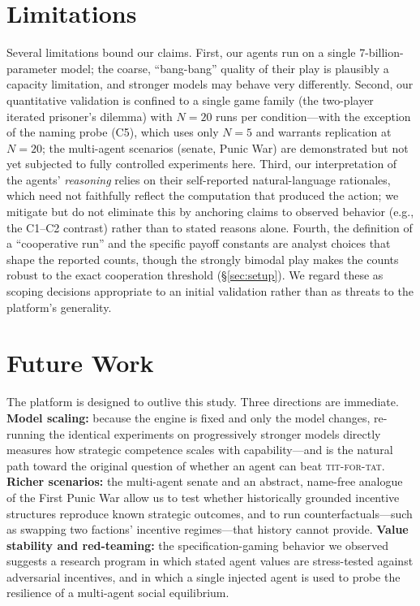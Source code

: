 \section{Limitations}
\label{sec:limitations}

Several limitations bound our claims. First, our agents run on a single 7-billion-parameter model; the coarse, ``bang-bang'' quality of their play is plausibly a capacity limitation, and stronger models may behave very differently. Second, our quantitative validation is confined to a single game family (the two-player iterated prisoner's dilemma) with $N=20$ runs per condition---with the exception of the naming probe (C5), which uses only $N=5$ and warrants replication at $N=20$; the multi-agent scenarios (senate, Punic War) are demonstrated but not yet subjected to fully controlled experiments here. Third, our interpretation of the agents' \emph{reasoning} relies on their self-reported natural-language rationales, which need not faithfully reflect the computation that produced the action; we mitigate but do not eliminate this by anchoring claims to observed behavior (e.g., the C1--C2 contrast) rather than to stated reasons alone. Fourth, the definition of a ``cooperative run'' and the specific payoff constants are analyst choices that shape the reported counts, though the strongly bimodal play makes the counts robust to the exact cooperation threshold (\S\ref{sec:setup}). We regard these as scoping decisions appropriate to an initial validation rather than as threats to the platform's generality.

\section{Future Work}
\label{sec:future}

The platform is designed to outlive this study. Three directions are immediate. \textbf{Model scaling:} because the engine is fixed and only the model changes, re-running the identical experiments on progressively stronger models directly measures how strategic competence scales with capability---and is the natural path toward the original question of whether an agent can beat \textsc{tit-for-tat}. \textbf{Richer scenarios:} the multi-agent senate and an abstract, name-free analogue of the First Punic War allow us to test whether historically grounded incentive structures reproduce known strategic outcomes, and to run counterfactuals---such as swapping two factions' incentive regimes---that history cannot provide. \textbf{Value stability and red-teaming:} the specification-gaming behavior we observed suggests a research program in which stated agent values are stress-tested against adversarial incentives, and in which a single injected agent is used to probe the resilience of a multi-agent social equilibrium.

